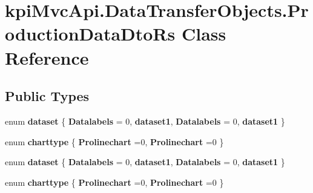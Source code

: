 \hypertarget{classkpi_mvc_api_1_1_data_transfer_objects_1_1_production_data_dto_rs}{}\section{kpi\+Mvc\+Api.\+Data\+Transfer\+Objects.\+Production\+Data\+Dto\+Rs Class Reference}
\label{classkpi_mvc_api_1_1_data_transfer_objects_1_1_production_data_dto_rs}
\subsection*{Public Types}
\begin{DoxyCompactItemize}
\item 
\mbox{\label{classkpi_mvc_api_1_1_data_transfer_objects_1_1_production_data_dto_rs_ab356c7600182705746e7b61967dd63df}} 
enum {\bfseries dataset} \{ {\bfseries Datalabels} = 0, 
{\bfseries dataset1}, 
{\bfseries Datalabels} = 0, 
{\bfseries dataset1}
 \}
\item 
\mbox{\label{classkpi_mvc_api_1_1_data_transfer_objects_1_1_production_data_dto_rs_a45716f0cdee396710530b9562be56f9a}} 
enum {\bfseries charttype} \{ {\bfseries Prolinechart} =0, 
{\bfseries Prolinechart} =0
 \}
\item 
\mbox{\label{classkpi_mvc_api_1_1_data_transfer_objects_1_1_production_data_dto_rs_ab356c7600182705746e7b61967dd63df}} 
enum {\bfseries dataset} \{ {\bfseries Datalabels} = 0, 
{\bfseries dataset1}, 
{\bfseries Datalabels} = 0, 
{\bfseries dataset1}
 \}
\item 
\mbox{\label{classkpi_mvc_api_1_1_data_transfer_objects_1_1_production_data_dto_rs_a45716f0cdee396710530b9562be56f9a}} 
enum {\bfseries charttype} \{ {\bfseries Prolinechart} =0, 
{\bfseries Prolinechart} =0
 \}
\end{DoxyCompactItemize}
